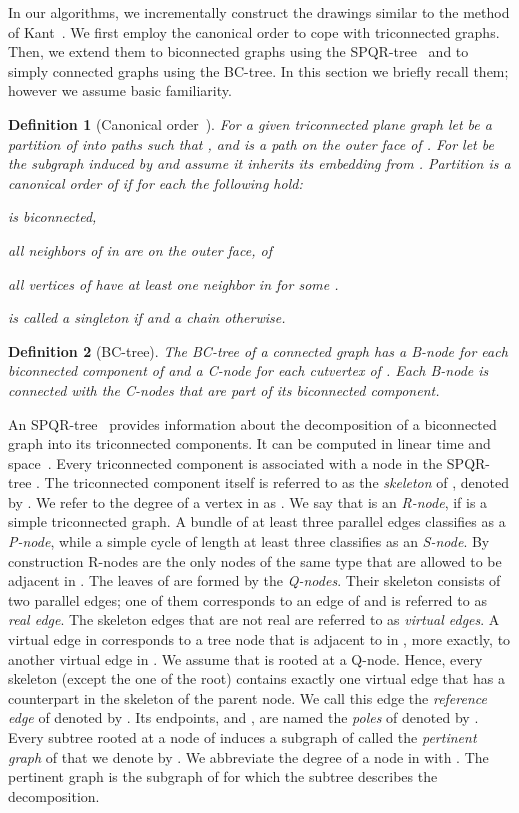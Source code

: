 \documentclass[a4paper,twoside,11pt]{article}
\newtheorem{definition}{Definition}
\begin{document}
In our algorithms, we incrementally construct the drawings similar
to the method of Kant~\cite{Kant92b}. We first employ the canonical
order to cope with triconnected graphs. Then, we extend them to
biconnected graphs using the SPQR-tree~\cite{BT90} and to simply connected
graphs using the BC-tree. In this section we briefly recall them;
however we assume basic familiarity.


\begin{definition}[Canonical order~\cite{Kant92b}]
For a given triconnected plane graph  let  be a partition of  into paths such that ,  and  is a path on the outer face of . For  let
 be the subgraph induced by  and assume it 
inherits its embedding from . Partition  is a canonical
order of  if for each  the following hold:
\begin{inparaenum}[(i)]
\item  is biconnected,
\item all neighbors of  in  are on the outer face,
of 
\item all vertices of  have at least one neighbor in 
for some .
\end{inparaenum}
 is called a singleton if  and a chain otherwise.
\end{definition}

\begin{definition}[BC-tree]
The \emph{BC-tree}  of a connected graph  has a
B-node for each biconnected component of  and a C-node for each
cutvertex of . Each B-node is connected with the C-nodes that are
part of its biconnected component.
\end{definition}

An SPQR-tree~\cite{BT90} provides information about the
decomposition of a biconnected graph into its triconnected
components. It can be computed in linear time and space~\cite{GM00}.
Every triconnected component is associated with a node
 in the SPQR-tree . The triconnected component
itself is referred to as the \emph{skeleton} of , denoted by
. We refer to the degree of
a vertex  in  as . We
say that  is an \emph{R-node}, if  is a simple
triconnected graph. A bundle of at least three parallel edges
classifies  as a \emph{P-node}, while a simple cycle of length
at least three classifies  as an \emph{S-node}. By construction
R-nodes are the only nodes of the same type that are allowed to be
adjacent in . The leaves of  are formed by
the \emph{Q-nodes}. Their skeleton consists of two parallel edges;
one of them corresponds to an edge of  and is referred to as
\emph{real edge}. The skeleton edges that are not real are referred
to as \emph{virtual edges}. A virtual edge  in 
corresponds to a tree node  that is adjacent to  in
, more exactly, to another virtual edge  in
. We assume that  is rooted at a Q-node.
Hence, every skeleton (except the one of the root) contains exactly
one virtual edge  that has a counterpart in the skeleton
of the parent node. We call this edge the \emph{reference edge} of
 denoted by . Its endpoints,  and , are
named the \emph{poles} of  denoted by . Every subtree rooted at a node  of 
induces a subgraph of  called the \emph{pertinent graph} of 
that we denote by . We
abbreviate the degree of a node  in  with
. The pertinent graph is the subgraph of  for
which the subtree describes the decomposition.
\end{document}
